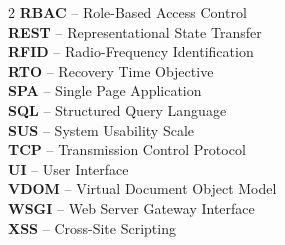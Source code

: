 \begin{multicols}{2}
\textbf{RBAC} -- Role-Based Access Control \\
\textbf{REST} -- Representational State Transfer \\
\textbf{RFID} -- Radio-Frequency Identification \\
\textbf{RTO} -- Recovery Time Objective \\
\textbf{SPA} -- Single Page Application \\
\textbf{SQL} -- Structured Query Language \\
\textbf{SUS} -- System Usability Scale \\
\textbf{TCP} -- Transmission Control Protocol \\
\textbf{UI} -- User Interface \\
\textbf{VDOM} -- Virtual Document Object Model \\
\textbf{WSGI} -- Web Server Gateway Interface \\
\textbf{XSS} -- Cross-Site Scripting
\end{multicols}
